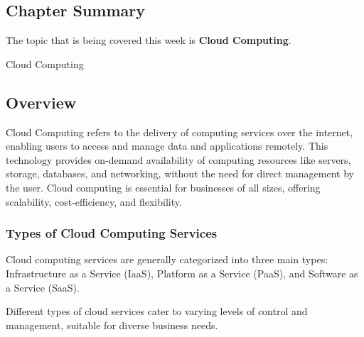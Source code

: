 \subsection{Chapter Summary}

The topic that is being covered this week is \textbf{Cloud Computing}.

\begin{notes}{Cloud Computing}
    \subsection*{Overview}

    Cloud Computing refers to the delivery of computing services over the internet, enabling users to access and manage data and applications remotely. This technology provides on-demand availability 
    of computing resources like servers, storage, databases, and networking, without the need for direct management by the user. Cloud computing is essential for businesses of all sizes, offering 
    scalability, cost-efficiency, and flexibility.
    
    \subsubsection*{Types of Cloud Computing Services}
    
    Cloud computing services are generally categorized into three main types: Infrastructure as a Service (IaaS), Platform as a Service (PaaS), and Software as a Service (SaaS).
    
    \begin{highlight}
    
        Different types of cloud services cater to varying levels of control and management, suitable for diverse business needs.
        

\end{highlight}
\end{notes}
